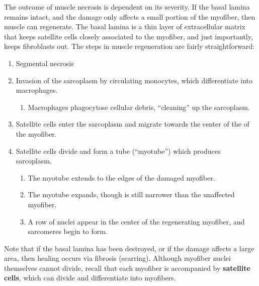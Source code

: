 \documentclass[openany]{book}
\providecommand{\tightlist}{%
  \setlength{\itemsep}{0pt}\setlength{\parskip}{0pt}}
\begin{document}
The outcome of muscle necrosis is dependent on its severity. If the
basal lamina remains intact, and the damage only affects a small portion
of the myofiber, then muscle can regenerate. The basal lamina is a thin
layer of extracellular matrix that keeps satellite cells closely
associated to the myofiber, and just importantly, keeps fibroblasts out.
The steps in muscle regeneration are fairly straightforward:

\begin{enumerate}
\def\labelenumi{\arabic{enumi}.}
\tightlist
\item
  Segmental necrosis
\item
  Invasion of the sarcoplasm by circulating monocytes, which
  differentiate into macrophages.

  \begin{enumerate}
  \def\labelenumii{\roman{enumii})}
  \tightlist
  \item
    Macrophages phagocytose cellular debris, ``cleaning'' up the
    sarcoplasm.
  \end{enumerate}
\item
  Satellite cells enter the sarcoplasm and migrate towards the center of
  the of the myofiber.
\item
  Satellite cells divide and form a tube (``myotube'') which produces
  sarcoplasm.

  \begin{enumerate}
  \def\labelenumii{\roman{enumii})}
  \tightlist
  \item
    The myotube extends to the edges of the damaged myofiber.
  \item
    The myotube expands, though is still narrower than the unaffected
    myofiber.
  \item
    A row of nuclei appear in the center of the regenerating myofiber,
    and sarcomeres begin to form.
  \end{enumerate}
\end{enumerate}

Note that if the basal lamina has been destroyed, or if the damage
affects a large area, then healing occurs via fibrosis (scarring).
Although myofiber nuclei themselves cannot divide, recall that each
myofiber is accompanied by \textbf{satellite cells}, which can divide
and differentiate into myofibers.
\end{document}
